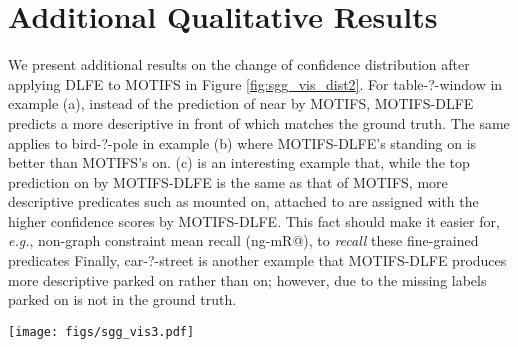\documentclass[sigconf]{acmart}
\begin{document}
\section{Additional Qualitative Results}
\label{sec:appendix_qualitative_results}
We present additional results on the change of confidence distribution after applying DLFE to MOTIFS in Figure \ref{fig:sgg_vis_dist2}. 
For {\selectfont table-?-window} in example (a), instead of the prediction of {\selectfont near} by MOTIFS, MOTIFS-DLFE predicts a more descriptive {\selectfont in front of} which matches the ground truth.
The same applies to {\selectfont bird-?-pole} in example (b) where MOTIFS-DLFE's {\selectfont standing on} is better than MOTIFS's {\selectfont on}. 
(c) is an interesting example that, while the top prediction {\selectfont on} by MOTIFS-DLFE is the same as that of MOTIFS, more descriptive predicates such as {\selectfont mounted on}, {\selectfont attached to} are assigned with the higher confidence scores by MOTIFS-DLFE.
This fact should make it easier for, \emph{e.g.}, non-graph constraint mean recall (ng-mR@), to \textit{recall} these fine-grained predicates
Finally, {\selectfont car-?-street} is another example that MOTIFS-DLFE produces more descriptive {\selectfont parked on} rather than {\selectfont on}; however, due to the missing labels {\selectfont parked on} is not in the ground truth.

\begin{figure*}[t!]
\begin{center}
\texttt{[image: figs/sgg\_vis3.pdf]}
\end{center}
\vspace{-1em}
  \caption{Confidence distributions over the predicates, produced by MOTIFS (top of each example) and MOTIFS with DLFE (bottom). \textcolor{Green}{Green}, \textcolor{Red}{red} and \textcolor{Dandelion}{tangerine} predicates denote correct (GT), incorrect (Non-GT and weird) and acceptable (Non-GT but reasonable), respectively.}
\label{fig:sgg_vis_dist2}
\vspace{-1em}
\end{figure*}
\end{document}
